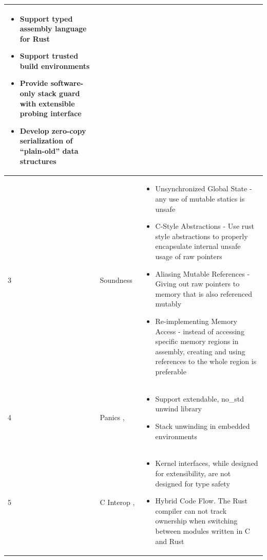 \documentclass[sigconf]{acmart}
\begin{document}
\begin{table}
\begin{tabular}{p{1cm} p{5cm} p{10cm}}
\begin{itemize}
            \item Support typed assembly language for Rust
            \item Support trusted build environments
            \item Provide software-only stack guard with extensible probing interface
            \item Develop zero-copy serialization of “plain-old” data structures
        \end{itemize}
        \\
        \hline
        3 & Soundness~\cite{Klimt2023-ob} &
        \begin{itemize}
            \item Unsynchronized Global State - any use of mutable statics is unsafe
            \item C-Style Abstractions - Use rust style abstractions to properly encapsulate internal unsafe usage of raw pointers
            \item Aliasing Mutable References - Giving out raw pointers to memory that is also referenced mutably
            \item Re-implementing Memory Access - instead of accessing specific memory regions in assembly, creating and using references to the whole region is preferable
        \end{itemize}
        \\
        \hline
        4 & Panics \cite{Ma2023-ef},\cite{Burtsev2021-mh} &
        \begin{itemize}
            \item Support extendable, no\_std unwind library
            \item Stack unwinding in embedded environments
        \end{itemize}
        \\
        \hline
        5 & C Interop \cite{Miller2019-xm}, \cite{Li2021-xo} &
        \begin{itemize}
            \item Kernel interfaces, while designed for extensibility, are not designed for type safety
            \item Hybrid Code Flow. The Rust compiler can not track ownership when switching between modules written in C and Rust
        \end{itemize}
        \\
    \hline
  \end{tabular}
  \label{tab:RQ3}
\end{table}
\end{document}
